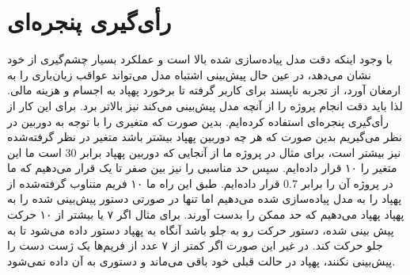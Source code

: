 \section{رأی‌گیری پنجره‌ای}
با وجود اینکه دقت مدل پیاده‌سازی شده بالا است و عملکرد بسیار چشم‌گیری از خود نشان می‌دهد، در عین حال پیش‌بینی اشتباه مدل می‌تواند عواقب زیان‌باری را به ارمغان آورد، 
از تجربه ناپسند برای کاربر گرفته تا برخورد پهپاد به اجسام و هزینه مالی. لذا باید دقت انجام پروژه را از آنچه مدل پیش‌بینی می‌کند نیز بالاتر برد. برای این کار از رأی‌گیری پنجره‌ای 
استفاده کرده‌ایم. بدین صورت که متغیری را با توجه به  دوربین در نظر می‌گیریم بدین صورت که هر چه  دوربین پهپاد بیشتر باشد متغیر در نظر گرفته‌شده نیز بیشتر 
است، برای مثال در پروژه ما از آنجایی که دوربین پهپاد برابر 30  است ما این متغیر را ۱۰ قرار داده‌ایم.  سپس حد مناسبی را نیز بین صفر تا یک قرار می‌دهیم که ما در 
پروژه آن را برابر 0.7  قرار داده‌ایم. طبق این راه ما ۱۰ فریم متناوب گرفته‌شده از پهپاد را به مدل پیاده‌سازی شده می‌دهیم اما تنها در صورتی دستور پیش‌بینی شده را به پهپاد
پهپاد می‌دهیم که حد ممکن را بدست آورند. برای مثال اگر ۷ یا بیشتر از ۱۰ حرکت پیش بینی شده، دستور حرکت رو به جلو باشد آنگاه به پهپاد دستور داده می‌شود تا به جلو حرکت کند. 
در غیر این صورت اگر کمتر از ۷ عدد از فریم‌ها یک ژست دست را پیش‌بینی نکنند، پهپاد در حالت قبلی خود باقی می‌ماند و دستوری به آن داده نمی‌شود.
